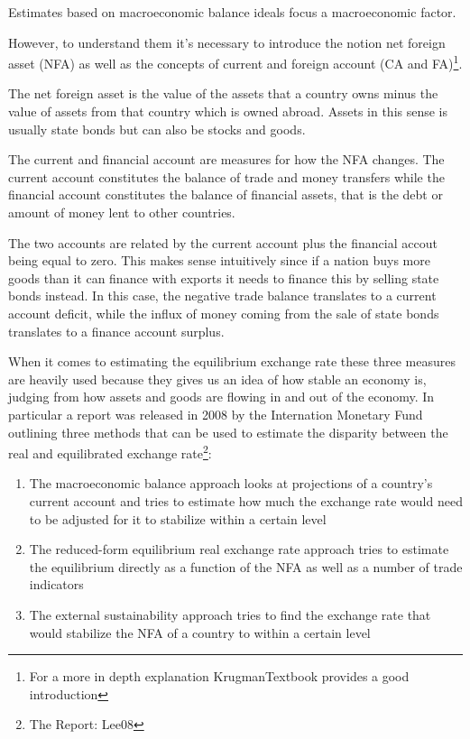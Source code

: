 \documentclass[11pt]{article}
\begin{document}
Estimates based on macroeconomic balance ideals focus a macroeconomic factor. 

However, to understand 
them it's necessary to introduce the notion net foreign asset (NFA) as 
well as the concepts of current and foreign account (CA and 
FA)\footnote{For a more in depth explanation \cite{ch.  
18}{KrugmanTextbook} provides a good introduction}.

The net foreign asset is the value of the assets that a country owns 
minus the value of assets from that country which is owned abroad.  
Assets in this sense is usually state bonds but can also be stocks and 
goods.  

The current and financial account are measures for how the NFA changes.  
The current account constitutes the balance of trade and money transfers 
while the financial account constitutes the balance of financial assets, 
that is the debt or amount of money lent to other countries. 

The two accounts are related by the current account plus the financial 
accout being equal to zero. This makes sense intuitively since if a 
nation buys more goods than it can finance with exports it needs to 
finance this by selling state bonds instead. In this case, the negative 
trade balance translates to a current account deficit, while the influx 
of money coming from the sale of state bonds translates to a finance 
account surplus.

When it comes to estimating the equilibrium exchange rate these three 
measures are heavily used because they gives us an idea of how stable an 
economy is, judging from how assets and goods are flowing in and out of 
the economy. In particular a report was released in 2008 by the 
Internation Monetary Fund outlining three methods that can be used to 
estimate the disparity between the real and equilibrated exchange 
rate\footnote{The Report: \cite{pp.  1}{Lee08}}:

\begin{enumerate}
\item{The macroeconomic balance approach looks at projections of a 
	country's current account and tries to estimate how much the 
exchange rate would need to be adjusted for it to stabilize within a 
certain level}
\item{The reduced-form equilibrium real exchange rate approach tries to 
	estimate the equilibrium directly as a function of the NFA as well 
as a number of trade indicators}
\item{The external sustainability approach tries to find the exchange 
	rate that would stabilize the NFA of a country to within a certain 
level}
\end{enumerate}
\end{document}
